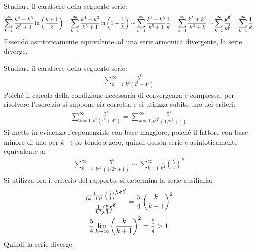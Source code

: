 \documentclass{article}
\numberwithin{equation}{subsection}
\begin{document}
Studiare il carattere della seguente serie:
\begin{gather*}
    \displaystyle\sum_{k=1}^\infty\frac{k^4+k^3}{k^5+1}\ln\left(\frac{k+1}{k}\right)=
    \displaystyle\sum_{k=1}^\infty\frac{k^4+k^3}{k^5+1}\ln\left(1+\frac{1}{k}\right)\sim
    \displaystyle\sum_{k=1}^\infty\frac{k^4+k^3}{k^5+1}\frac{1}{k}=
    \displaystyle\sum_{k=1}^\infty\frac{k^5+k^4}{k^6+k}\sim
    \displaystyle\sum_{k=1}^\infty\frac{\cancel{k^5}}{k^{\cancel{6}}}=
    \displaystyle\sum_{k=1}^\infty\frac{1}{k}
\end{gather*}
Essendo asintoticamente equivalente ad una serie armonica divergente, la serie diverge. 


Studiare il carattere della seguente serie:
\begin{gather*}
    \displaystyle\sum_{k=1}^\infty\frac{5^k}{k^2(2^k+4^k)}
\end{gather*}
Poiché il calcolo della condizione necessaria di convergenza è complessa, per risolvere l'esercizio si suppone sia corretta e si utilizza subito uno dei criteri:
\begin{gather*}
    \displaystyle\sum_{k=1}^\infty\frac{5^k}{k^2(2^k+4^k)}=
    \displaystyle\sum_{k=1}^\infty\frac{5^k}{k^24^k(1/2^k+1)}
\end{gather*}
Si mette in evidenza l'esponenziale con base maggiore, poiché il fattore con base minore di uno per $k\to\infty$ tende a zero, quindi questa serie è asintoticamente equivalente a:
\begin{gather*}
    \displaystyle\sum_{k=1}^\infty\frac{5^k}{k^24^k(1/2^k+1)}\sim
    \displaystyle\sum_{k=1}^\infty\frac{1}{k^2}\left(\frac{5}{4}\right)^k
\end{gather*}
Si utilizza ora il criterio del rapporto, si determina la serie ausiliaria:
\begin{gather*}
    \displaystyle\frac{\frac{1}{(k+1)^2}\left(\frac{5}{4}\right)^{\cancel{k+1}}}{\frac{1}{k^2}\cancel{\left(\frac{5}{4}\right)^k}}=\frac{5}{4}\left(\frac{k}{k+1}\right)^2\\
    \frac{5}{4}\lim_{k\to\infty}\left(\frac{k}{k+1}\right)^2=\frac{5}{4}>1
\end{gather*}
Quindi la serie diverge.  
\end{document}
